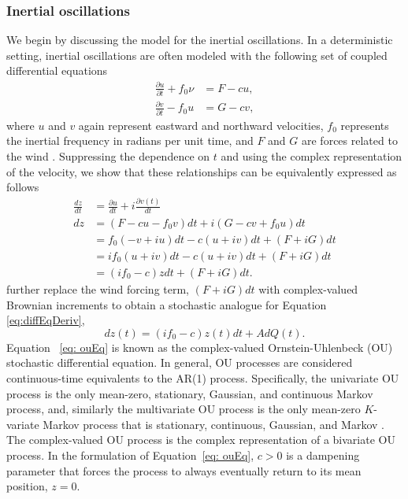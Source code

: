 \documentclass{stat572Style}
\begin{document}
\subsubsection{Inertial oscillations}
We begin by discussing the model for the inertial oscillations. 
In a deterministic setting, inertial oscillations are often modeled with the following set of coupled differential equations
\begin{align}
\label{eq: deterOsc}
\frac{\partial u }{\partial t}  + f_{0} \nu &= F - cu,\\ \nonumber
\frac{\partial v}{\partial t} - f_{0}u &= G - cv,
\end{align}
where $u$ and $v$ again represent eastward and northward velocities, $f_{0}$ represents the inertial frequency in radians per unit time, and $F$ and $G$ are forces related to the wind  \citep{Pollard1970}. 
Suppressing the dependence on $t$ and using the complex representation of the velocity,  we show that these relationships can be equivalently expressed as follows
\begin{align}
\label{eq:diffEqDeriv}
\nonumber
\frac{dz}{dt} &= \frac{\partial u}{dt} + i\frac{\partial v(t)}{dt} \\ \nonumber
dz &= (F - c u- f_{0}v)dt + i(G - cv + f_{0}u)dt\\ \nonumber
&= f_{0}(-v + iu)dt - c(u + iv)dt + (F + iG)dt\\ \nonumber
&= if_{0}(u + iv)dt - c(u + iv)dt + (F + iG)dt\\ 
&= (if_{0} - c)z dt + (F + iG)dt. 
\end{align}
\citet{Sykulski2016} further replace the wind forcing term, $(F + iG)dt$  with complex-valued Brownian increments \citep{Mandelbrot1968} to obtain a stochastic analogue for Equation \ref{eq:diffEqDeriv},
 \begin{equation}
\label{eq: ouEq}
dz(t) = (i f_{0} -c) z(t) dt + A d Q(t). 
\end{equation}  
Equation ~\ref{eq: ouEq}  is known as the complex-valued Ornstein-Uhlenbeck (OU) stochastic differential equation. 
In general,  OU processes are considered continuous-time equivalents to the AR(1) process. Specifically,  the univariate OU process is the only mean-zero, stationary, Gaussian, and continuous Markov process, and, similarly the multivariate OU process is the only mean-zero $K$-variate Markov process that is stationary, continuous, Gaussian, and Markov \citep{Schach1971}.
 The complex-valued OU process is the complex representation of a bivariate OU process.  
 In the formulation of Equation~\ref{eq: ouEq}, $c > 0$ is a dampening parameter that forces the process to always eventually return to its mean position, $z = 0$.  
\end{document}
